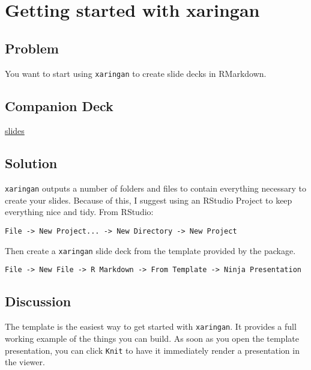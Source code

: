 \documentclass[]{book}
\theoremstyle{definition}
\theoremstyle{definition}
\theoremstyle{definition}
\theoremstyle{remark}
\begin{document}
\hypertarget{getting-started-with-xaringan}{%
\chapter{Getting started with
xaringan}\label{getting-started-with-xaringan}}

\hypertarget{problem-1}{%
\section{Problem}\label{problem-1}}

You want to start using \texttt{xaringan} to create slide decks in
RMarkdown.

\hypertarget{companion-deck-1}{%
\section{Companion Deck}\label{companion-deck-1}}

\href{http://xaringan-field-guide-companion.davisvaughan.com/02-getting-started/getting-started.html\#1}{slides}

\hypertarget{solution-1}{%
\section{Solution}\label{solution-1}}

\texttt{xaringan} outputs a number of folders and files to contain
everything necessary to create your slides. Because of this, I suggest
using an RStudio Project to keep everything nice and tidy. From RStudio:

\texttt{File\ -\textgreater{}\ New\ Project...\ -\textgreater{}\ New\ Directory\ -\textgreater{}\ New\ Project}

Then create a \texttt{xaringan} slide deck from the template provided by
the package.

\texttt{File\ -\textgreater{}\ New\ File\ -\textgreater{}\ R\ Markdown\ -\textgreater{}\ From\ Template\ -\textgreater{}\ Ninja\ Presentation}

\hypertarget{discussion-1}{%
\section{Discussion}\label{discussion-1}}

The template is the easiest way to get started with \texttt{xaringan}.
It provides a full working example of the things you can build. As soon
as you open the template presentation, you can click \texttt{Knit} to
have it immediately render a presentation in the viewer.
\end{document}
